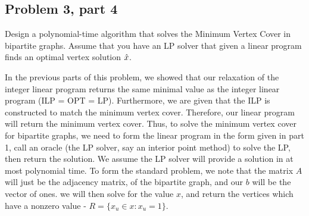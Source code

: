 \subsection{Problem 3, part 4}
Design a polynomial-time algorithm that solves the Minimum Vertex Cover in bipartite graphs. Assume that you have an LP solver that given a linear program finds an optimal vertex solution $\hat{x}$.
\partbreak
\begin{solution}

    In the previous parts of this problem, we showed that our relaxation of the integer linear program returns the same minimal value as the integer linear program (ILP = OPT = LP). Furthermore, we are given that the ILP is constructed to match the minimum vertex cover. Therefore, our linear program will return the minimum vertex cover. Thus, to solve the minimum vertex cover for bipartite graphs, we need to form the linear program in the form given in part 1, call an oracle (the LP solver, say an interior point method) to solve the LP, then return the solution. We assume the LP solver will provide a solution in at most polynomial time. To form the standard problem, we note that the matrix $A$ will just be the adjacency matrix, of the bipartite graph, and our $b$ will be the vector of ones. we will then solve for the value $x$, and return the vertices which have a nonzero value - $R = \{ x_u \in x : x_u = 1\}.$  
\end{solution}
